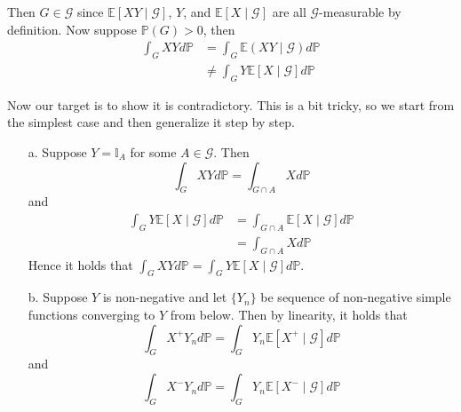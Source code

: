 \begin{enumerate}
    Then $G \in \mathcal{G}$ since $\mathbb{E}[XY \mid \mathcal{G}]$, $Y$, and $\mathbb{E}[X \mid \mathcal{G}]$ are all $\mathcal{G}$-measurable by definition.
    Now suppose $\mathbb{P}(G) > 0$, then
    \begin{equation} \label{2.20_contradiction}
        \begin{split}
            \int_{G} X Y d \mathbb{P}
            &= \int_{G} \mathbb{E}(X Y \mid \mathcal{G}) d \mathbb{P} \\
            &\neq \int_{G} Y \mathbb{E}[X \mid \mathcal{G}] d \mathbb{P}
        \end{split}
    \end{equation}

    Now our target is to show it is contradictory.
    This is a bit tricky, so we start from the simplest case and then generalize it step by step.
    \begin{enumerate}
        \item[a.] Suppose $Y = \mathbb{I}_A$ for some $A \in \mathcal{G}$.
        Then
        \begin{equation}
            \int_{G} X Y d \mathbb{P} = \int_{G \cap A} X d \mathbb{P}
        \end{equation}
        and
        \begin{equation}
            \begin{split}
                \int_{G} Y \mathbb{E}[X \mid \mathcal{G}] d \mathbb{P}
                &= \int_{G \cap A} \mathbb{E}[X \mid \mathcal{G}] d \mathbb{P}\\
                &= \int_{G \cap A} X d \mathbb{P}
            \end{split}
        \end{equation}
        Hence it holds that $\int_{G} X Y d \mathbb{P} = \int_{G} Y \mathbb{E}[X \mid \mathcal{G}] d \mathbb{P}$.
        \item[b.] Suppose $Y$ is non-negative and let $\{Y_n\}$ be sequence of non-negative simple functions converging to $Y$ from below.
        Then by linearity, it holds that
        \begin{equation}
            \int_{G} X^+ Y_n d \mathbb{P} = \int_{G} Y_n \mathbb{E}[X^+ \mid \mathcal{G}] d \mathbb{P}
        \end{equation}
        and
        \begin{equation}
            \int_{G} X^- Y_n d \mathbb{P} = \int_{G} Y_n \mathbb{E}[X^- \mid \mathcal{G}] d \mathbb{P}
        \end{equation}


\end{enumerate}
\end{enumerate}
